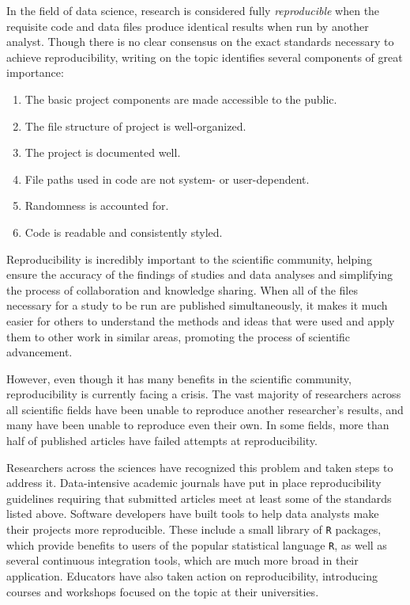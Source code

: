 \documentclass[12pt,twoside]{reedthesis}
\begin{document}
In the field of data science, research is considered fully \emph{reproducible} when the requisite code and data files produce identical results when run by another analyst. Though there is no clear consensus on the exact standards necessary to achieve reproducibility, writing on the topic identifies several components of great importance:
\begin{enumerate}
\def\labelenumi{\arabic{enumi}.}
\item
  The basic project components are made accessible to the public.
\item
  The file structure of project is well-organized.
\item
  The project is documented well.
\item
  File paths used in code are not system- or user-dependent.
\item
  Randomness is accounted for.
\item
  Code is readable and consistently styled.
\end{enumerate}
Reproducibility is incredibly important to the scientific community, helping ensure the accuracy of the findings of studies and data analyses and simplifying the process of collaboration and knowledge sharing. When all of the files necessary for a study to be run are published simultaneously, it makes it much easier for others to understand the methods and ideas that were used and apply them to other work in similar areas, promoting the process of scientific advancement.

However, even though it has many benefits in the scientific community, reproducibility is currently facing a crisis. The vast majority of researchers across all scientific fields have been unable to reproduce another researcher's results, and many have been unable to reproduce even their own. In some fields, more than half of published articles have failed attempts at reproducibility.

Researchers across the sciences have recognized this problem and taken steps to address it.
Data-intensive academic journals have put in place reproducibility guidelines requiring that submitted articles meet at least some of the standards listed above. Software developers have built tools to help data analysts make their projects more reproducible. These include a small library of \texttt{R} packages, which provide benefits to users of the popular statistical language \texttt{R}, as well as several continuous integration tools, which are much more broad in their application. Educators have also taken action on reproducibility, introducing courses and workshops focused on the topic at their universities.
\end{document}
